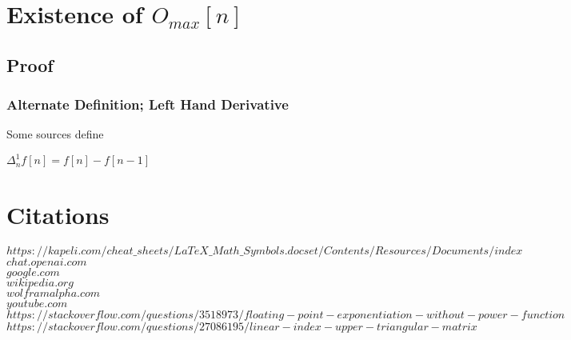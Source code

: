 \documentclass[11pt]{article}
\begin{document}
\section{Existence of $O_{max}[n]$}
\subsection{Proof}


\subsubsection{Alternate Definition; Left Hand Derivative}
Some sources define
\begin{center}
$
\Delta_n^1 f[n] = f[n] - f[n-1]
$
\end{center}


\newpage
\section*{Citations}
\rbrack \hspace{1mm} $https://kapeli.com/cheat\_sheets/LaTeX\_Math\_Symbols.docset/Contents/Resources/Documents/index$\\
\rbrack \hspace{1mm} $chat.openai.com$\\
\rbrack \hspace{1mm} $google.com$\\
\rbrack \hspace{1mm} $wikipedia.org$\\
\rbrack \hspace{1mm} $wolframalpha.com$\\
\rbrack \hspace{1mm} $youtube.com$\\
\rbrack \hspace{1mm} $https://stackoverflow.com/questions/3518973/floating-point-exponentiation-without-power-function$\\
\rbrack \hspace{1mm} $https://stackoverflow.com/questions/27086195/linear-index-upper-triangular-matrix$\\
\end{document}
